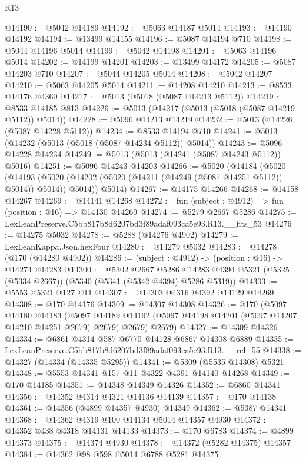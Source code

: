 \begin{lexlean}{R13}
\begin{coremodule}
@14190 := @5042 @14189
@14192 := @5063 @14187 @5014
@14193 := @14190 @14192
@14194 := @13499 @14155
@14196 := @5087 @14194 @710
@14198 := @5044 @14196 @5014
@14199 := @5042 @14198
@14201 := @5063 @14196 @5014
@14202 := @14199 @14201
@14203 := @13499 @14172
@14205 := @5087 @14203 @710
@14207 := @5044 @14205 @5014
@14208 := @5042 @14207
@14210 := @5063 @14205 @5014
@14211 := @14208 @14210
@14213 := @8533 @14176 @4360
@14217 := @5013 (@5018 (@5087 @14213 @5112))
@14219 := @8533 @14185 @813
@14226 := @5013 (@14217 (@5013 (@5018 (@5087 @14219 @5112)) @5014))
@14228 := @5096 @14213 @14219
@14232 := @5013 (@14226 (@5087 @14228 @5112))
@14234 := @8533 @14194 @710
@14241 := @5013 (@14232 (@5013 (@5018 (@5087 @14234 @5112)) @5014))
@14243 := @5096 @14228 @14234
@14249 := @5013 (@5013 (@14241 (@5087 @14243 @5112)) @5016)
@14251 := @5096 @14243 @14203
@14266 := @5020
    (@14184
      (@5020
        (@14193 (@5020 (@14202 (@5020 (@14211 (@14249 (@5087 @14251 @5112)) @5014)) @5014)) @5014))
      @5014)
@14267 := @14175 @14266
@14268 := @14158 @14267
@14269 := @14141 @14268
@14272 := fun (subject : @4912) => fun (position : @16) => @14130 @14269
@14274 := @5279 @2667 @5286
@14275 := LexLeanPreserve.C5bb817b8d6207bd3f89adaf093ca5e93.R13.__fits_53
@14276 := @14275 @5032
@14278 := @5288 (@14276 @4902)
@14279 := LexLeanKappa.Json.hexFour
@14280 := @14279 @5032
@14283 := @14278 (@170 (@14280 @4902))
@14286 := (subject : @4912) -> (position : @16) -> @14274 @14283
@14300 := @5302
    @2667
    @5286
    @14283
    @4394
    @5321
    (@5325 (@5334 @2667))
    (@5340 (@5341 (@5342 @4394) @5286 @5319))
@14303 := @5553 @5321 @127 @11
@14307 := @14303 @4316 @4392 @14129 @14269
@14308 := @170 @14176
@14309 := @14307 @14308
@14326 := @170
    (@5097
      @14180
      @14183
      (@5097 @14189 @14192 (@5097 @14198 @14201 (@5097 @14207 @14210 @14251 @2679) @2679) @2679)
      @2679)
@14327 := @14309 @14326
@14334 := @6861 @4314 @587 @6770 @14128 @6867 @14308 @6889
@14335 := LexLeanPreserve.C5bb817b8d6207bd3f89adaf093ca5e93.R13.__rel_55
@14338 := @14327 (@14334 (@14335 @5295))
@14341 := @5309 (@5535 @14308) @5321
@14348 := @5553 @14341 @157 @11 @4322 @4391 @14140 @14268
@14349 := @170 @14185
@14351 := @14348 @14349 @14326
@14352 := @6860 @14341
@14356 := @14352 @4314 @4321 @14136 @14139
@14357 := @170 @14138
@14361 := @14356 (@4899 @14357 @4930) @14349
@14362 := @5387 @14341
@14368 := @14362 @4319 @100 @14134 @5014 @14357 @4930
@14372 := @14352 @438 @4318 @14131 @14133
@14373 := @170 @6783
@14374 := @4899 @14373
@14375 := @14374 @4930
@14378 := @14372 (@5282 @14375) @14357
@14384 := @14362 @98 @598 @5014 @6788 @5281 @14375

\end{coremodule}
\end{lexlean}
